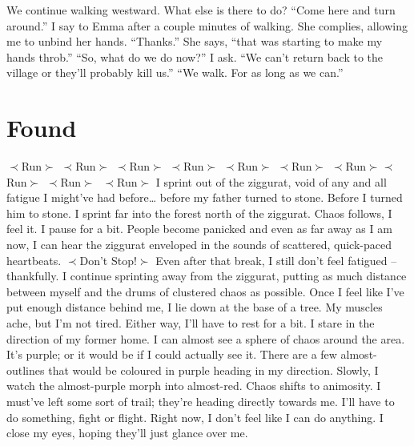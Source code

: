 \documentclass[openany, 12pt]{book}
\newcommand\tab[1][1cm]{\hspace*{#1}}
\begin{document}
\newline
\tab
We continue walking westward. What else is there to do? ``Come here and turn around.'' I say to Emma after a couple minutes of walking. She complies, allowing me to unbind her hands.
\newline
\tab
``Thanks.'' She says, ``that was starting to make my hands throb.'' 
\newline
\tab
``So, what do we do now?'' I ask. ``We can’t return back to the village or they’ll probably kill us.''
\newline
\tab
``We walk. For as long as we can.''
\chapter{Found}
$\prec$Run$\succ$ $\prec$Run$\succ$ $\prec$Run$\succ$\newline
\tab$\prec$Run$\succ$ $\prec$Run$\succ$ $\prec$Run$\succ$\newline
$\prec$Run$\succ$\tab$\prec$Run$\succ$ $\prec$Run$\succ$\newline
\tab\tab$\>\prec$Run$\succ$\newline
\tab
I sprint out of the ziggurat, void of any and all fatigue I might’ve had before… before my father turned to stone. Before I turned him to stone. I sprint far into the forest north of the ziggurat. Chaos follows, I feel it. I pause for a bit. People become panicked and even as far away as I am now, I can hear the ziggurat enveloped in the sounds of scattered, quick-paced heartbeats.\newline
$\prec$Don't Stop!$\succ$\newline
\tab
Even after that break, I still don’t feel fatigued – thankfully. I continue sprinting away from the ziggurat, putting as much distance between myself and the drums of clustered chaos as possible. Once I feel like I’ve put enough distance behind me, I lie down at the base of a tree. My muscles ache, but I’m not tired. Either way, I’ll have to rest for a bit. I stare in the direction of my former home. I can almost see a sphere of chaos around the area. It’s purple; or it would be if I could actually see it. There are a few almost-outlines that would be coloured in purple heading in my direction. Slowly, I watch the almost-purple morph into almost-red. Chaos shifts to animosity.
\newline
\tab
I must’ve left some sort of trail; they’re heading directly towards me. I’ll have to do something, fight or flight. Right now, I don’t feel like I can do anything. I close my eyes, hoping they’ll just glance over me.
\end{document}
